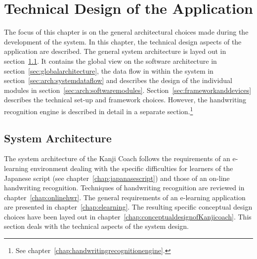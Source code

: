 
\chapter{Technical Design of the Application}
\label{chap:technicaldesign}




The focus of this chapter is on the general architectural choices made during
the development of the system. In this chapter, the technical design aspects 
of the application are described. The general system architecture is layed out in
section~\ref{sec:systemarchitecture}. It contains the global view on the software
architecture in section~\ref{sec:globalarchitecture}, the data flow in within
the system in section~\ref{sec:arch:systemdataflow} and describes the design
of the individual modules in section~\ref{sec:arch:softwaremodules}.
Section~\ref{sec:frameworkanddevices} describes the technical set-up and 
framework choices. However, the handwriting recognition engine is described 
in detail in a separate 
section.\footnote{See chapter~\ref{chap:handwritingrecognitionengine}.}

\section{System Architecture}
\label{sec:systemarchitecture}

The system architecture of the Kanji Coach follows the requirements of an 
e-learning environment dealing with the specific difficulties for learners 
of the Japanese script (see chapter~\ref{chap:japanasescript}) and those of an 
on-line handwriting recognition. Techniques of handwriting recognition are 
reviewed in chapter~\ref{chap:onlinehwr}. The general requirements of an 
e-learning application are presented in chapter~\ref{chap:elearning}. 
The resulting specific conceptual design choices have been 
layed out in chapter~\ref{chap:conceptualdesignofKanjicoach}. This
section deals with the technical aspects of the system design.

